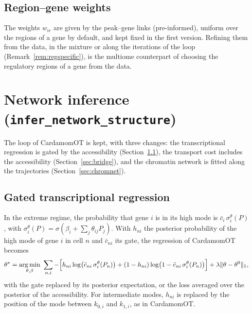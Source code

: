 \documentclass[a4paper, 11pt]{article}
\DeclareMathOperator*{\argmin}{arg\,min}
\newcommand{\cbar}{\bar c}
\theoremstyle{plain}
\theoremstyle{remark}
\begin{document}
\subsection{Region--gene weights}

The weights $w_{ir}$ are given by the peak--gene links (pre-informed), uniform over the regions of a gene by default, and kept fixed in the first version. Refining them from the data, in the mixture or along the iterations of the loop (Remark~\ref{rem:regspecific}), is the multiome counterpart of choosing the regulatory regions of a gene from the data.

\section{Network inference (\texttt{infer\_network\_structure})}\label{sec:network}

The loop of CardamomOT is kept, with three changes: the transcriptional regression is gated by the accessibility (Section~\ref{sec:gated}), the transport cost includes the accessibility (Section~\ref{sec:bridge}), and the chromatin network is fitted along the trajectories (Section~\ref{sec:chromnet}).

\subsection{Gated transcriptional regression}\label{sec:gated}

In the extreme regime, the probability that gene $i$ is in its high mode is $\cbar_i\,\sigma_i^\theta(P)$, with $\sigma_i^\theta(P) = \sigma(\beta_i + \sum_j\theta_{ij}P_j)$. With $h_{ni}$ the posterior probability of the high mode of gene $i$ in cell $n$ and $\cbar_{ni}$ its gate, the regression of CardamomOT becomes
\begin{equation}\label{eq:gated}
\theta^\ast = \argmin_{\theta, \beta}\ \sum_{n,i} -\Bigl[h_{ni}\log\bigl(\cbar_{ni}\,\sigma_i^\theta(P_n)\bigr) + (1 - h_{ni})\log\bigl(1 - \cbar_{ni}\,\sigma_i^\theta(P_n)\bigr)\Bigr] + \lambda\|\theta - \theta^0\|_1 ,
\end{equation}
with the gate replaced by its posterior expectation, or the loss averaged over the posterior of the accessibility. For intermediate modes, $h_{ni}$ is replaced by the position of the mode between $k_{0,i}$ and $k_{1,i}$, as in CardamomOT.
\end{document}
